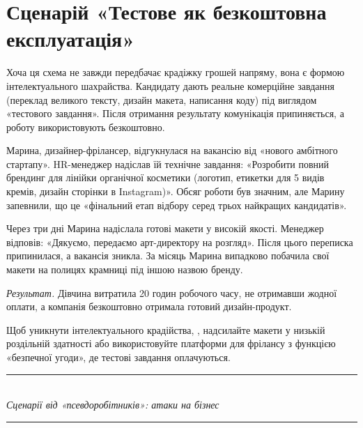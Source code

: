 \newpage 

\vspace{0.3cm}
\section{Сценарій «Тестове як безкоштовна експлуатація»}

Хоча ця схема не завжди передбачає крадіжку грошей напряму, вона є формою інтелектуального шахрайства. Кандидату дають реальне комерційне завдання (переклад великого тексту, дизайн макета, написання коду) під виглядом «тестового завдання». Після отримання результату комунікація припиняється, а роботу використовують безкоштовно.


Марина, дизайнер-фрілансер, відгукнулася на вакансію від «нового амбітного стартапу». HR-менеджер надіслав їй технічне завдання: «Розробити повний брендинг для лінійки органічної косметики (логотип, етикетки для 5 видів кремів, дизайн сторінки в Instagram)». Обсяг роботи був значним, але Марину запевнили, що це «фінальний етап відбору серед трьох найкращих кандидатів».

Через три дні Марина надіслала готові макети у високій якості. Менеджер відповів: «Дякуємо, передаємо арт-директору на розгляд». Після цього переписка припинилася, а вакансія зникла. За місяць Марина випадково побачила свої макети на полицях крамниці під іншою назвою бренду. 

\textit{Результат.} Дівчина витратила 20 годин робочого часу, не отримавши жодної оплати, а компанія безкоштовно отримала готовий дизайн-продукт.

\newpage 

 Щоб уникнути інтелектуального крадійства, , надсилайте макети у низькій роздільній здатності або використовуйте платформи для фрілансу з функцією «безпечної угоди», де тестові завдання оплачуються.


\begin{center}
    \rule{0.8\textwidth}{0.1pt} \\ \vspace{0.2cm}
    \textit{Сценарії від «псевдоробітників»: атаки на бізнес}
    \rule{0.8\textwidth}{0.1pt}
\end{center}
\vspace{0.1cm}

